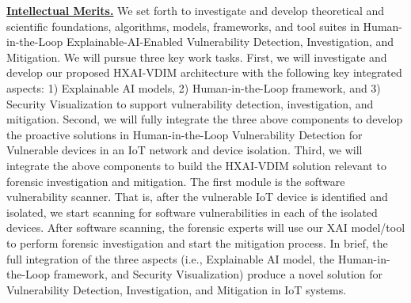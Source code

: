 \documentclass[11pt]{article}
\begin{document}

\noindent \underline{\bf Intellectual Merits.} 
We set forth to investigate and develop theoretical and scientific foundations, algorithms, models, frameworks, and tool suites in Human-in-the-Loop Explainable-AI-Enabled Vulnerability Detection, Investigation, and Mitigation. We will pursue three key work tasks. First, we will investigate and develop our proposed HXAI-VDIM architecture with the following key integrated aspects: 1) Explainable AI models, 2) Human-in-the-Loop framework, and 3) Security Visualization to support vulnerability detection, investigation, and mitigation. Second, we will fully integrate the three above components to develop the proactive solutions in Human-in-the-Loop Vulnerability Detection for Vulnerable devices in an IoT network and device isolation. Third, we  will integrate the above components to  build the HXAI-VDIM solution relevant  to  forensic  investigation  and  mitigation. The first  module  is  the  software  vulnerability  scanner.   That  is,  after  the  vulnerable  IoT  device  is  identified and isolated, we start scanning for software vulnerabilities in each of the isolated devices.  After software scanning, the forensic experts will use our XAI model/tool to perform forensic investigation and start the mitigation process. In brief, the full integration of the three aspects (i.e., Explainable AI model, the Human-in-the-Loop framework, and Security Visualization) produce a novel solution for Vulnerability Detection, Investigation, and Mitigation in IoT systems.
\end{document}
